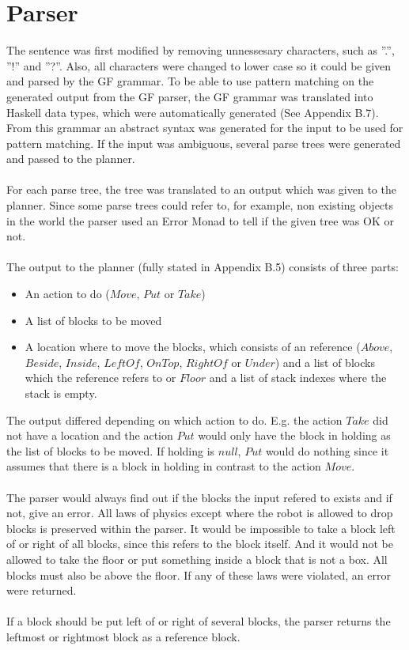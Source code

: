 \section{Parser}
The sentence was first modified by removing unnessesary characters, such as ''.'', ''!'' and ''?''. Also, all characters were changed to lower case so it could be given and parsed by the GF grammar. To be able to use pattern matching on the generated output from the GF parser, the GF grammar was translated into Haskell data types, which were automatically generated (See Appendix B.7). From this grammar an abstract syntax was generated for the input to be used for pattern matching. If the input was ambiguous, several parse trees were generated and passed to the planner. \\\\
For each parse tree, the tree was translated to an output which was given to the planner. Since some parse trees could refer to, for example, non existing objects in the world the parser used an Error Monad to tell if the given tree was OK or not. \\\\
The output to the planner (fully stated in Appendix B.5) consists of three parts:
\begin{itemize}
\item An action to do ($Move$, $Put$ or $Take$)
\item A list of blocks to be moved
\item A location where to move the blocks, which consists of an reference ($Above$, $Beside$, $Inside$, $LeftOf$, $OnTop$, $RightOf$ or $Under$) and a list of blocks which the reference refers to or $Floor$ and a list of stack indexes where the stack is empty.
\end{itemize}
The output differed depending on which action to do. E.g. the action $Take$ did not have a location and the action $Put$ would only have the block in holding as the list of blocks to be moved. If holding is $null$, $Put$ would do nothing since it assumes that there is a block in holding in contrast to the action $Move$.\\\\
The parser would always find out if the blocks the input refered to exists and if not, give an error. All laws of physics except where the robot is allowed to drop blocks is preserved within the parser. It would be impossible to take a block left of or right of all blocks, since this refers to the block itself. And it would not be allowed to take the floor or put something inside a block that is not a box. All blocks must also be above the floor. If any of these laws were violated, an error were returned.
 \\\\
If a block should be put left of or right of several blocks, the parser returns the leftmost or rightmost block as a reference block. 

